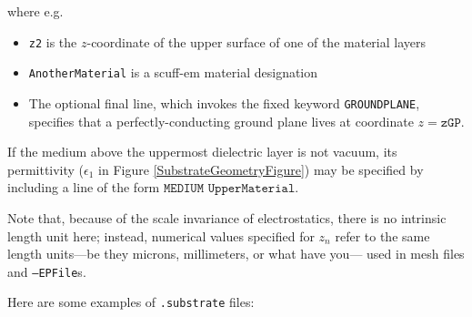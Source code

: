 \documentclass[letterpaper]{article}
\begin{document}
\medskip

where e.g.
\begin{itemize}
 \item \texttt{z2} is the $z$-coordinate of the upper surface of
       one of the material layers
 \item \texttt{AnotherMaterial} is a {\sc scuff-em} material designation
 \item The optional 
       final line, which invokes the fixed keyword \texttt{GROUNDPLANE},
       specifies that a perfectly-conducting ground plane lives at 
       coordinate $z=\texttt{zGP}$.
\end{itemize}
If the medium above the uppermost dielectric layer is not vacuum,
its permittivity ($\epsilon_1$ in Figure \ref{SubstrateGeometryFigure})
may be specified by including a line of the form
$\texttt{MEDIUM UpperMaterial}.$

Note that, because of the scale invariance of electrostatics,
there is no intrinsic length unit here; instead, numerical values
specified for $z_n$ refer to the same length units---be they
microns, millimeters, or what have you--- used in mesh files 
and \texttt{--EPFile}s.

Here are some examples of \texttt{.substrate} files:
\end{document}
